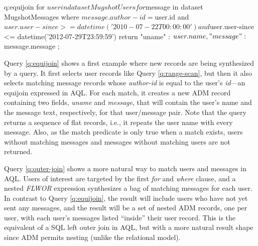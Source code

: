 \begin{query}[Equijoin]{q:equijoin}
for $user in dataset MugshotUsers
for $message in dataset MugshotMessages
where $message.author-id = $user.id
  and $user.user-since >= datetime('2010-07-22T00:00:00')
  and $user.user-since <= datetime('2012-07-29T23:59:59')
return {
  "uname" : $user.name,
  "message" : $message.message
};
\end{query}

Query \ref{q:equijoin} shows a first example where new records are being synthesized by a query.
It first selects user records like Query \ref{q:range-scan}, but then it also selects matching message records whose \emph{author-id} is equal to the user's \emph{id}---an equijoin expressed in AQL.
For each match, it creates a new ADM record containing two fields, \emph{uname} and \emph{message}, that will contain the user’s name and the message text, respectively, for that user/message pair. 
Note that the query returns a sequence of flat records, i.e., it repeats the user name with every message. Also, as the match predicate is only true when a match exists, users without matching messages and messages without matching users are not returned.


Query \ref{q:outer-join} shows a more natural way to match users and messages in AQL.
Users of interest are targeted by the first \emph{for} and \emph{where} clause, and a nested \emph{FLWOR} expression synthesizes a bag of matching messages for each user.
In contrast to Query \ref{q:equijoin}, the result will include users who have not yet sent any messages, and the result will be a set of nested ADM records, one per user, with each user's messages listed ``inside'' their user record.
This is the equivalent of a SQL left outer join in AQL, but with a more natural result shape since ADM permits nesting (unlike the relational model).


